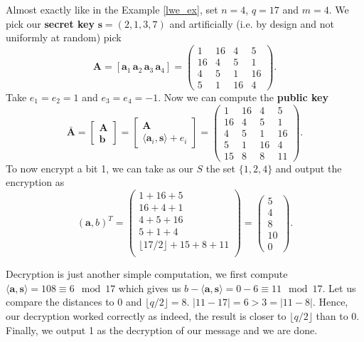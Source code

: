 \begin{example}
    Almost exactly like in the Example \ref{lwe_ex}, set $n = 4$, $q=17$ and $m=4$. We pick our \textbf{secret key} $\bm{s} = (2,1,3,7)$ and artificially (i.e. by design and not uniformly at random) pick
    \[ \bm{A} = [\bm{a}_1 \, \bm{a}_2 \, \bm{a}_3 \, \bm{a}_4] = 
        \begin{pmatrix}1 & 16 & 4 & 5\\
                        16 & 4 & 5 & 1 \\
                        4 & 5 & 1 & 16 \\
                        5 & 1 & 16 & 4
        \end{pmatrix}. \]
        Take $e_1 = e_2 = 1$ and $e_3 = e_4 = -1$. Now we can compute the \textbf{public key} 
        \[ \bar{\bm{A}} = \begin{bmatrix} \bm{A} \\ \bm{b} \end{bmatrix} = 
        \begin{bmatrix} \bm{A} \\ \langle \bm{a}_i, \bm{s} \rangle + e_i \end{bmatrix}  = 
        \begin{pmatrix} 1 & 16 & 4 & 5 \\
            16 & 4 & 5 & 1 \\
            4 & 5 & 1 & 16 \\
            5 & 1 & 16 & 4 \\
            15 & 8 & 8 & 11
        \end{pmatrix}.
        \]
    To now encrypt a bit 1, we can take as our $S$ the set $\{1,2,4\}$ and output the encryption as
     \[(\bm{a}, b)^T = \begin{pmatrix} 1 + 16 + 5\\ 
                16 + 4 + 1\\
                4 + 5 + 16 \\
                5 + 1 + 4 \\
                \lfloor 17/2 \rfloor + 15 + 8 + 11 \\
                \end{pmatrix} = \begin{pmatrix} 5 \\ 4 \\ 8 \\ 10 \\ 0  \end{pmatrix}.
            \]

            Decryption is just another simple computation, we first compute $\langle \bm{a}, \bm{s} \rangle = 108 \equiv 6 \mod 17$ which gives us $b - \langle \bm{a}, \bm{s} \rangle = 0 - 6 \equiv 11 \mod 17$. Let us compare the distances to 0 and $\lfloor q/2 \rfloor = 8$. $|11 - 17| = 6 > 3 = |11 - 8|$. Hence, our decryption worked correctly as indeed, the result is closer to $\lfloor q/2 \rfloor$ than to 0. Finally, we output 1 as the decryption of our message and we are done.
\end{example}

